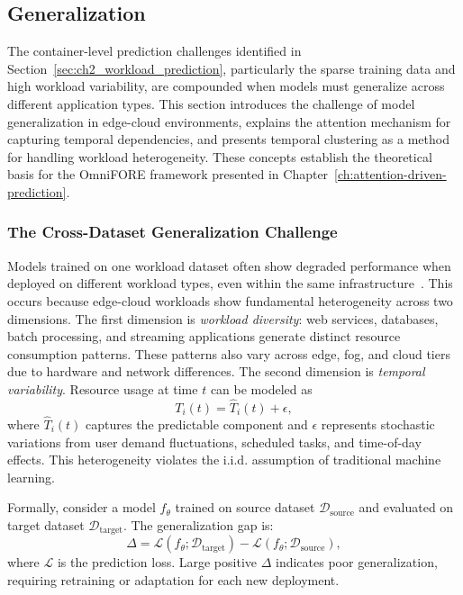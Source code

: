 \subsection{Generalization}
\label{sec:ch2_generalization}

The container-level prediction challenges identified in Section~\ref{sec:ch2_workload_prediction}, particularly the sparse training data and high workload variability, are compounded when models must generalize across different application types. This section introduces the challenge of model generalization in edge-cloud environments, explains the attention mechanism for capturing temporal dependencies, and presents temporal clustering as a method for handling workload heterogeneity. These concepts establish the theoretical basis for the \ac{OmniFORE} framework presented in Chapter~\ref{ch:attention-driven-prediction}.

\subsubsection{The Cross-Dataset Generalization Challenge}
\label{subsec:ch2_generalization_challenge}

Models trained on one workload dataset often show degraded performance when deployed on different workload types, even within the same infrastructure~\cite{zou2024generalization}. This occurs because edge-cloud workloads show fundamental heterogeneity across two dimensions. The first dimension is \textit{workload diversity}: web services, databases, batch processing, and streaming applications generate distinct resource consumption patterns. These patterns also vary across edge, fog, and cloud tiers due to hardware and network differences. The second dimension is \textit{temporal variability}. Resource usage at time $t$ can be modeled as
\[
T_i(t) = \hat{T}_i(t) + \epsilon,
\]
where $\hat{T}_i(t)$ captures the predictable component and $\epsilon$ represents stochastic variations from user demand fluctuations, scheduled tasks, and time-of-day effects. This heterogeneity violates the i.i.d. assumption of traditional machine learning.

Formally, consider a model $f_\theta$ trained on source dataset $\mathcal{D}_{\text{source}}$ and evaluated on target dataset $\mathcal{D}_{\text{target}}$. The generalization gap is:
\begin{equation}
\Delta = \mathcal{L}(f_\theta; \mathcal{D}_{\text{target}}) - \mathcal{L}(f_\theta; \mathcal{D}_{\text{source}}),
\end{equation}
where $\mathcal{L}$ is the prediction loss. Large positive $\Delta$ indicates poor generalization, requiring retraining or adaptation for each new deployment.

